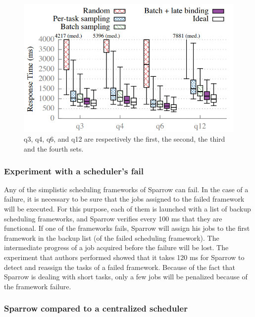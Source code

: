 \documentclass[11pt]{article}
\begin{document}
            \begin{figure}
            		\centering
            		\includegraphics[scale=.35]{fig4}
				\caption{q3, q4, q6, and q12 are respectively the first, the second, the third and the fourth sets.}            		
            		\label{fig4}
            \end{figure}
        
        
        \subsubsection*{Experiment with a scheduler's fail}
        
        	Any of the simplistic scheduling frameworks of Sparrow can fail. In the case of a failure, it is necessary to be sure that the jobs assigned to the failed framework will be executed. For this purpose, each of them is launched with a list of backup scheduling frameworks, and Sparrow verifies every 100 ms that they are functional. If one of the frameworks fails, Sparrow will assign his jobs to the first framework in the backup list (of the failed scheduling framework). The intermediate progress of a job acquired before the failure will be lost. The experiment that authors performed showed that it takes 120 ms for Sparrow to detect and reassign the tasks of a failed framework. Because of the fact that Sparrow is dealing with short tasks, only a few jobs will be penalized because of the framework failure.
        
        
        \subsubsection*{Sparrow compared to a centralized scheduler}
        
\end{document}

